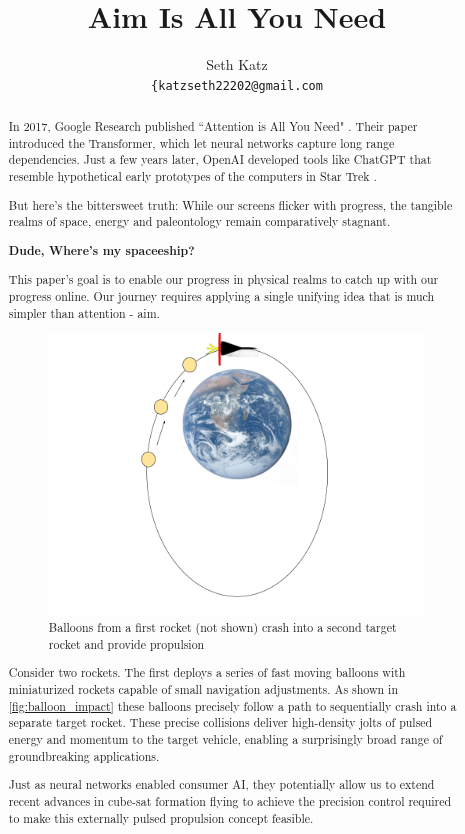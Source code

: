 \documentclass{article}
\title{Aim Is All You Need}
\author{
  Seth Katz \\
  \texttt{\{katzseth22202@gmail.com} \\
}
\begin{document}
\maketitle

\begin{abstract}\label{sec:abstract}
 In 2017, Google Research published ``Attention is All You Need" \cite{vaswani2023attentionneed}.  Their paper introduced the Transformer, which let neural networks capture long range dependencies.   Just a few years later, OpenAI developed tools like ChatGPT \cite{chatgpt} that resemble hypothetical early prototypes of the computers in Star Trek \cite{startrek}.

But here's the bittersweet truth:  While our screens flicker with progress, the tangible realms of space, energy and paleontology remain comparatively stagnant.

\textbf{Dude, Where's my spaceeship?}

This paper's goal is to enable our progress in physical realms to catch up with our progress online.  Our journey requires applying a single unifying idea that is much simpler than attention - aim.   \begin{figure}[h]
    \centering
    \includegraphics[width=0.5\linewidth]{images/Starship_Impact_ellipse.png}
    \caption{Balloons from a first rocket (not shown) crash into a second target rocket and provide propulsion}
    \label{fig:balloon_impact}
\end{figure}

Consider two rockets.   The first deploys a series of fast moving balloons with miniaturized rockets capable of small navigation adjustments.  As shown in \autoref{fig:balloon_impact} these balloons precisely follow a path to sequentially crash  into a separate  target rocket.   These precise collisions deliver high-density jolts of pulsed energy and momentum to the target vehicle, enabling a surprisingly broad range of groundbreaking applications.    

Just as neural networks enabled consumer AI, they potentially allow us to extend recent advances in cube-sat formation flying to achieve the precision control required to make this externally pulsed propulsion concept feasible.


\end{abstract}
\end{document}
